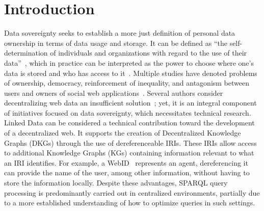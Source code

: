\section{Introduction}

Data sovereignty seeks to establish a more just definition of personal data ownership in terms of data usage and storage.
It can be defined as ``the self-determination of individuals and organizations with regard to the use of their data''~\cite{verstraete2022solid},
which in practice can be interpreted as the power to choose where one's data is stored and who has access to it~\cite{verstraete2022solid}.
Multiple studies have denoted problems of ownership, democracy, reinforcement of inequality, and antagonism between users and owners of social web applications~\cite{Terranova2000FreeLP, Curran2016ch1, Sevignani2013, 9663788}.
Several authors consider decentralizing web data an insufficient solution~\cite{9663788, Curran2016ch1}; yet, it is an integral component of initiatives focused on data sovereignty,
which necessitates technical research.
Linked Data can be considered a technical contribution toward the development of a decentralized web.
It supports the creation of Decentralized Knowledge Graphs (DKGs) through the use of dereferenceable IRIs.
These IRIs allow access to additional Knowledge Graphs (KGs) containing information relevant to what an IRI identifies.
For example, a WebID~ represents an agent, dereferencing it can provide the name of the user, among other information, without having to store the information locally.
Despite these advantages, SPARQL query processing is predominantly carried out in centralized environments, partially due to a more established understanding of how to optimize queries in such settings.

